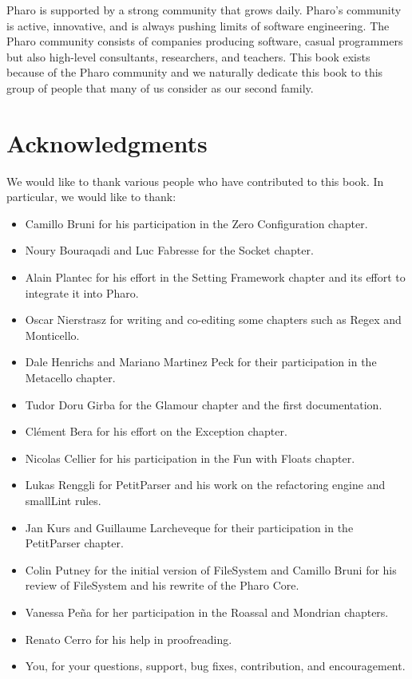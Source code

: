 \documentclass[a4paper,10pt,twoside]{book}
\begin{document}

Pharo is supported by a strong community that grows daily. Pharo's community is active, innovative, and is always pushing limits of software engineering. The Pharo community consists of companies producing software, casual programmers but also high-level consultants, researchers, and teachers.
This book exists because of the Pharo community and we naturally dedicate this book to this group of people that many of us consider as our second family.


\section*{Acknowledgments}

We would like to thank various people who have contributed to this book. In particular, we would like to thank:
\begin{itemize}
\item Camillo Bruni for his participation in the Zero Configuration chapter.
\item Noury Bouraqadi and Luc Fabresse for the Socket chapter.
\item Alain Plantec for his effort in the Setting Framework chapter and its effort to integrate it into Pharo.
\item Oscar Nierstrasz for writing and co-editing some chapters such as Regex and Monticello.
\item Dale Henrichs and Mariano Martinez Peck for their participation in the Metacello chapter.
\item Tudor Doru Girba for the Glamour chapter and the first documentation.
\item Cl\'ement Bera for his effort on the Exception chapter.
\item Nicolas Cellier for his participation in the Fun with Floats chapter.
\item Lukas Renggli for PetitParser and his work on the refactoring engine and smallLint rules. 
\item Jan Kurs and Guillaume Larcheveque for their participation in the PetitParser chapter.
\item Colin Putney for the initial version of FileSystem and Camillo Bruni for his review of FileSystem and his rewrite of the Pharo Core.
\item Vanessa Pe\~na for her participation in the Roassal and Mondrian chapters.
\item Renato Cerro for his help in proofreading.
\item You, for your questions, support, bug fixes, contribution, and encouragement.
\end{itemize}
\end{document}
